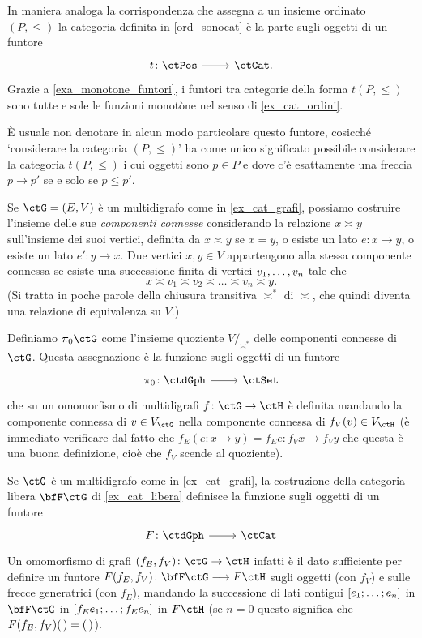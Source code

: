 \begin{remark}\label{ord_come_cat}
 In maniera analoga la corrispondenza che assegna a un insieme ordinato \((P,\le)\) la categoria definita in \ref{ord_sonocat} è la parte sugli oggetti di un funtore
 \[\dmFun{t}{\ctPos}{\ctCat.}\]
 Grazie a \ref{exa_monotone_funtori}, i funtori tra categorie della forma \(t(P,\le)\) sono tutte e sole le funzioni monotòne nel senso di \ref{ex_cat_ordini}.

 È usuale non denotare in alcun modo particolare questo funtore, cosicché `considerare la categoria \((P,\le)\)' ha come unico significato possibile considerare la categoria \(t(P,\le)\) i cui oggetti sono \(p\in P\) e dove c'è esattamente una freccia \(p\to p'\) se e solo se \(p\le p'\).
\end{remark}
\begin{example}\label{ex_fun_cpt_conn}
 Se \(\ctG=(E,V)\) è un multidigrafo come in \ref{ex_cat_grafi}, possiamo costruire l'insieme delle sue \emph{componenti connesse} considerando la relazione \(x\asymp y\) sull'insieme dei suoi vertici, definita da \(x\asymp y\) se \(x=y\), o esiste un lato \(e \colon x \to y\), o esiste un lato \(e' \colon y\to x\). Due vertici \(x,y\in V\) appartengono alla stessa componente connessa se esiste una successione finita di vertici \({\tup vn,}\) tale che
 \[x \asymp v_1 \asymp v_2 \asymp\dots\asymp v_n\asymp y.\]
 (Si tratta in poche parole della chiusura transitiva \(\asymp^*\) di \(\asymp\), che quindi diventa una relazione di equivalenza su \(V\).)

 Definiamo \(\pi_0\ctG\) come l'insieme quoziente \(V/_{\!\asymp^*}\) delle componenti connesse di \(\ctG\). Questa assegnazione è la funzione sugli oggetti di un funtore
 \[\dmFun{\pi_0}{\ctdGph}{\ctSet}\]
 che su un omomorfismo di multidigrafi \(f \colon \ctG \to\ctH\) è definita mandando la componente connessa di \(v\in V_\ctG\) nella componente connessa di \(f_V(v)\in V_\ctH\) (è immediato verificare dal fatto che \(f_E(e \colon x\to y)=f_Ee \colon f_Vx\to f_Vy\) che questa è una buona definizione, cioè che \(f_V\) scende al quoziente).
\end{example}
\begin{example}
 Se \(\ctG\) è un multidigrafo come in \ref{ex_cat_grafi}, la costruzione della categoria libera \(\bfF\ctG\) di \ref{ex_cat_libera} definisce la funzione sugli oggetti di un funtore
 \[\dmFun F\ctdGph\ctCat\]
 Un omomorfismo di grafi \((f_E,f_V) \colon \ctG \to \ctH\) infatti è il dato sufficiente per definire un funtore \(F(f_E,f_V) \colon \bfF\ctG \fun F\ctH\) sugli oggetti (con \(f_V\)) e sulle frecce generatrici (con \(f_E\)), mandando la successione di lati contigui \([\tup en;]\) in \(\bfF\ctG\) in \([\tup {{f_E}e}n;]\) in \(F\ctH\) (se \(n=0\) questo significa che \(F(f_E,f_V)(\,) = (\,)\)).
\end{example}
